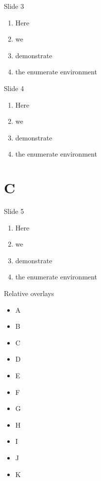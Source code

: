 \IfFileExists{./header.tex}{}{\documentclass[a4paper,style=default]{powerdot}}
\begin{document}
\begin{slide}{Slide 3}
  \begin{enumerate}[type=1]
    \item<1-> Here
      \item<2-> we
        \item<3-> demonstrate
          \item<4-> the enumerate environment
  \end{enumerate}
\end{slide}

\begin{slide}{Slide 4}
  \begin{enumerate}[type=1]
    \item<1> Here
      \item<2> we
        \item<3> demonstrate
          \item<4> the enumerate environment
  \end{enumerate}
\end{slide}

\section{C}

\begin{slide}{Slide 5}
  \begin{enumerate}[type=0]
    \item<1> Here
      \item<2> we
        \item<3> demonstrate
          \item<4> the enumerate environment
  \end{enumerate}
\end{slide}

\begin{slide}{Relative overlays}
   \begin{itemize}
     \item A \pause
     \item B \pause
     \item C 
     \pause
     \item D 
     \pause
     \item E \pause
     \item F \pause
     \item G \pause
     \item H \pause
     \item I \pause
     \item J \pause
     \item K
   \end{itemize}
 \end{slide}
\end{document}
